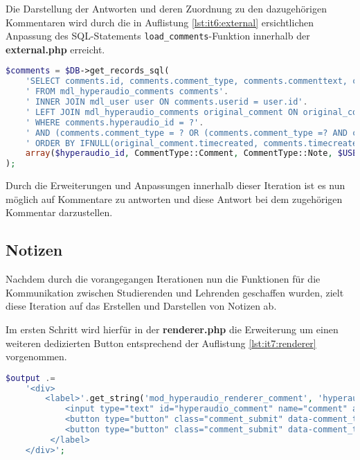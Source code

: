 Die Darstellung der Antworten und deren Zuordnung zu den dazugehörigen Kommentaren wird durch die in Auflistung \ref{lst:it6:external} ersichtlichen Anpassung des SQL-Statements \texttt{load_comments}-Funktion innerhalb der \textbf{external.php} erreicht.

\begin{lstlisting}[language=php,
             linewidth=\textwidth,
             caption={Ausschnitt der \textbf{external.php} in der 6. Iteration},
             label={lst:it6:external}]
$comments = $DB->get_records_sql(
	'SELECT comments.id, comments.comment_type, comments.commenttext, comments.timeannotated, comments.timecreated, user.username, comments.comment_id'.
	' FROM mdl_hyperaudio_comments comments'.
	' INNER JOIN mdl_user user ON comments.userid = user.id'.
	' LEFT JOIN mdl_hyperaudio_comments original_comment ON original_comment.id = comments.comment_id'.
	' WHERE comments.hyperaudio_id = ?'.
	' AND (comments.comment_type = ? OR (comments.comment_type =? AND comments.userid = ?))'.
	' ORDER BY IFNULL(original_comment.timecreated, comments.timecreated)*POWER(10, 11) + comments.timecreated',
	array($hyperaudio_id, CommentType::Comment, CommentType::Note, $USER->id)
);
\end{lstlisting}

Durch die Erweiterungen und Anpassungen innerhalb dieser Iteration ist es nun möglich auf Kommentare zu antworten und diese Antwort bei dem zugehörigen Kommentar darzustellen.


\subsection{Notizen}
Nachdem durch die vorangegangen Iterationen nun die Funktionen für die Kommunikation zwischen Studierenden und Lehrenden geschaffen wurden, zielt diese Iteration auf das Erstellen und Darstellen von Notizen ab.

Im ersten Schritt wird hierfür in der \textbf{renderer.php} die Erweiterung um einen weiteren dedizierten Button entsprechend der Auflistung \ref{lst:it7:renderer} vorgenommen.

\begin{lstlisting}[language=php,
             linewidth=\textwidth,
             caption={Ausschnitt der \textbf{renderer.php} in der 7. Iteration},
             label={lst:it7:renderer}]
$output .=
	'<div>
		<label>'.get_string('mod_hyperaudio_renderer_comment', 'hyperaudio').':
			<input type="text" id="hyperaudio_comment" name="comment" autocomplete="off"/>
			<button type="button" class="comment_submit" data-comment_type="'.CommentType::Comment.'">'.get_string('mod_hyperaudio_renderer_submit_comment', 'hyperaudio').'</button>
			<button type="button" class="comment_submit" data-comment_type="'.CommentType::Note.'">'.get_string('mod_hyperaudio_renderer_submit_note', 'hyperaudio').'</button>
		 </label>
	</div>';
\end{lstlisting}

